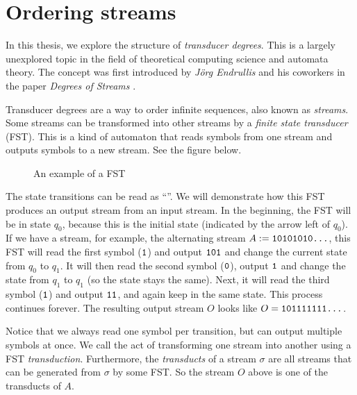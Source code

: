 \section*{Ordering streams}

In this thesis, we explore the structure of \textit{transducer degrees}. This is a largely unexplored topic in the field of theoretical computing science and automata theory. The concept was first introduced by \textit{Jörg Endrullis} and his coworkers in the paper \textit{Degrees of Streams} \cite{streams:degrees:2011}.
\vspace{1em}

Transducer degrees are a way to order infinite sequences, also known as \textit{streams}. Some streams can be transformed into other streams by a \textit{finite state transducer} (FST). This is a kind of automaton that reads symbols from one stream and outputs symbols to a new stream. See the figure below.

\begin{figure}[H]
	\centering
	\caption*{An example of a FST}
	\label{fig:first_trans}
\end{figure}

The state transitions can be read as ``''. We will demonstrate how this FST produces an output stream from an input stream. In the beginning, the FST will be in state $q_0$, because this is the initial state (indicated by the arrow left of $q_0$). If we have a stream, for example, the alternating stream $A := \texttt{10101010...}$, this FST will read the first symbol ($\texttt{1}$) and output $\texttt{101}$ and change the current state from $q_0$ to $q_1$. It will then read the second symbol ($\texttt{0}$), output $\texttt{1}$ and change the state from $q_1$ to $q_1$ (so the state stays the same). Next, it will read the third symbol ($\texttt{1}$) and output $\texttt{11}$, and again keep in the same state. This process continues forever. The resulting output stream $O$ looks like $O = \texttt{101111111...}$.
\vspace{1em}

Notice that we always read one symbol per transition, but can output multiple symbols at once. We call the act of transforming one stream into another using a FST \textit{transduction}. Furthermore, the \textit{transducts} of a stream $\sigma$ are all streams that can be generated from $\sigma$ by some FST. So the stream $O$ above is one of the transducts of $A$.
\vspace{1em}


